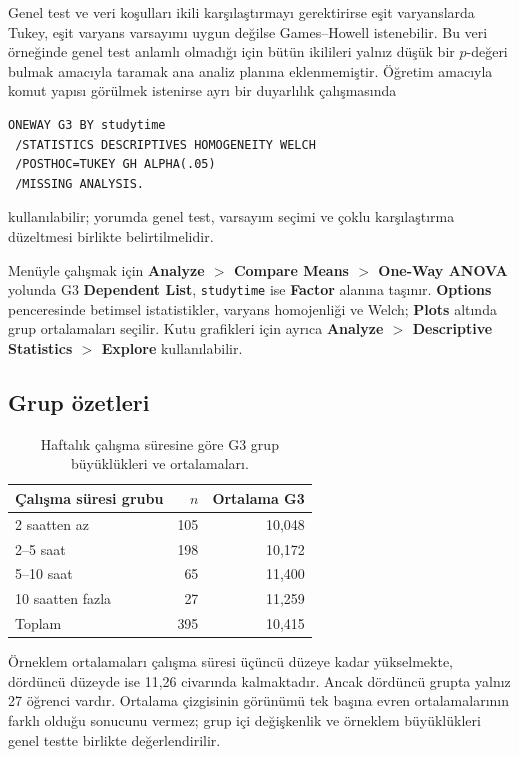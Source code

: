 Genel test ve veri koşulları ikili karşılaştırmayı gerektirirse eşit
varyanslarda Tukey, eşit varyans varsayımı uygun değilse Games--Howell
istenebilir. Bu veri örneğinde genel test anlamlı olmadığı için bütün ikilileri
yalnız düşük bir $p$-değeri bulmak amacıyla taramak ana analiz planına
eklenmemiştir. Öğretim amacıyla komut yapısı görülmek istenirse ayrı bir
duyarlılık çalışmasında

\begin{lstlisting}[language={}]
ONEWAY G3 BY studytime
 /STATISTICS DESCRIPTIVES HOMOGENEITY WELCH
 /POSTHOC=TUKEY GH ALPHA(.05)
 /MISSING ANALYSIS.
\end{lstlisting}

kullanılabilir; yorumda genel test, varsayım seçimi ve çoklu karşılaştırma
düzeltmesi birlikte belirtilmelidir.

Menüyle çalışmak için \textbf{Analyze $>$ Compare Means $>$ One-Way ANOVA}
yolunda G3 \textbf{Dependent List}, \texttt{studytime} ise \textbf{Factor}
alanına taşınır. \textbf{Options} penceresinde betimsel istatistikler,
varyans homojenliği ve Welch; \textbf{Plots} altında grup ortalamaları seçilir.
Kutu grafikleri için ayrıca \textbf{Analyze $>$ Descriptive Statistics $>$
Explore} kullanılabilir.

\subsection{Grup özetleri}

\begin{table}[htbp]
\centering
\caption{Haftalık çalışma süresine göre G3 grup büyüklükleri ve ortalamaları.}
\begin{tabular}{@{}p{}rr@{}}
\toprule
Çalışma süresi grubu & $n$ & Ortalama G3 \\
\midrule
2 saatten az & 105 & 10,048 \\
2--5 saat & 198 & 10,172 \\
5--10 saat & 65 & 11,400 \\
10 saatten fazla & 27 & 11,259 \\
\midrule
Toplam & 395 & 10,415 \\
\bottomrule
\end{tabular}
\end{table}

Örneklem ortalamaları çalışma süresi üçüncü düzeye kadar yükselmekte, dördüncü
düzeyde ise 11,26 civarında kalmaktadır. Ancak dördüncü grupta yalnız 27
öğrenci vardır. Ortalama çizgisinin görünümü tek başına evren ortalamalarının
farklı olduğu sonucunu vermez; grup içi değişkenlik ve örneklem büyüklükleri
genel testte birlikte değerlendirilir.

